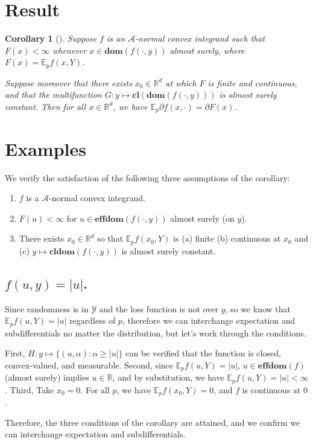 \documentclass[12pt]{article}
\newcommand{\reals}{\mathbb{R}}
\newcommand{\A}{\mathcal{A}}
\newcommand{\E}{\mathbb{E}}
\newcommand{\Y}{\mathcal{Y}}
\newcommand{\cl}{\mathbf{cl}}
\newcommand{\dom}{\mathbf{dom}}
\newcommand{\effdom}{\mathbf{effdom}}
\newtheorem{corollary}{Corollary}
\begin{document}
\section{Result}
\begin{corollary}[\cite{rockafellar1982interchange,ioffe1969minimization}]
	Suppose $f$ is an $\A$-normal convex integrand such that $F(x) < \infty$ whenever $x \in \dom(f(\cdot,y))$ almost surely, where $F(x) = \E_p f(x,Y)$.
	
	Suppose moreover that there exists $x_0 \in \reals^d$ at which $F$ is finite and continuous, and that the multifunction $G: y \mapsto \cl(\dom(f(\cdot,y)))$ is almost surely constant.
	Then for all $x \in \reals^d$, we have $\E_p \partial f(x, \cdot) = \partial F(x)$.
\end{corollary}


\section{Examples}
We verify the satisfaction of the following three assumptions of the corollary:
\begin{enumerate}
	\item $f$ is a $\A$-normal convex integrand.
	\item $F(u) < \infty$ for $u \in \effdom(f(\cdot,y))$ almost surely (on $y$).
	\item There exists $x_0 \in \reals^d$ so that $\E_p f(x_0, Y)$ is (a) finite (b) continuous at $x_0$ and (c) $y \mapsto \cl \dom (f(\cdot, y))$ is almost surely constant.
\end{enumerate}
\subsection{$f(u,y) = |u|$.}

Since randomness is in $\Y$ and the loss function is not over $y$, so we know that $\E_p f(u,Y) = |u|$ regardless of $p$, therefore we can interchange expectation and subdifferentials no matter the distribution, but let's work through the conditions.

First, $H : y \mapsto \{(u,\alpha) : \alpha \geq |u| \}$ can be verified that the function is closed, convex-valued, and measurable.
Second, since $\E_p f(u,Y) = |u|$, $u \in \effdom(f)$ (almost surely) implies $u \in \reals$, and by substitution, we have $\E_p f(u,Y) = |u| < \infty$.
Third, Take $x_0 = 0$.  For all $p$, we have $\E_p f(x_0, Y) = 0$, and $f$ is continuous at $0$.

Therefore, the three conditions of the corollary are attained, and we confirm we can interchange expectation and subdifferentials.
\end{document}
